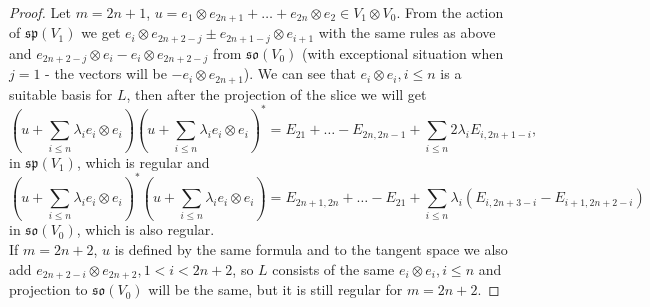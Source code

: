 \documentclass[12pt]{amsart}
\theoremstyle{definition}
\theoremstyle{remark}
\numberwithin{equation}{subsection}
\begin{document}
\begin{proof}
Let $m=2n+1$, $u=e_{1}\otimes e_{2n+1}+\dots + e_{2n}\otimes e_{2} \in V_1 \otimes V_0$. From the action of $\mathfrak{sp}(V_1)$ we get $e_i \otimes e_{2n+2-j}\pm e_{2n+1-j}\otimes e_{i+1}$ with the same rules as above and $e_{2n+2-j}\otimes e_{i}-e_{i}\otimes e_{2n+2-j}$ from $\mathfrak{so}(V_0)$ (with exceptional situation when $j=1$ - the vectors will be $-e_i\otimes e_{2n+1}$). We can see that $e_i\otimes e_i, i\le n$ is a suitable basis for $L$, then after the projection of the slice we will get
\begin{equation}
    (u+\sum_{i\le n} \lambda_i e_i \otimes e_i)(u+\sum_{i\le n} \lambda_i e_i \otimes e_i)^*= E_{21}+\dots -E_{2n,2n-1}+\sum_{i\le n} 2\lambda_i E_{i,2n+1-i},
\end{equation}
in $\mathfrak{sp}(V_1)$, which is regular and
\begin{equation}
   (u+\sum_{i\le n} \lambda_i e_i \otimes e_i)^*(u+\sum_{i\le n} \lambda_i e_i \otimes e_i) =E_{2n+1,2n}+\dots - E_{21}+\sum_{i\le n}\lambda_i (E_{i,2n+3-i}-E_{i+1,2n+2-i})
\end{equation}
in $\mathfrak{so}(V_0)$, which is also regular.\\
If $m=2n+2$, $u$ is defined by the same formula and to the tangent space we also add $e_{2n+2-i}\otimes e_{2n+2},1<i<2n+2$, so $L$ consists of the same $e_i\otimes e_i, i\le n$ and projection to $\mathfrak{so}(V_0)$ will be the same, but it is still regular for $m=2n+2$.
\end{proof}
\end{document}
